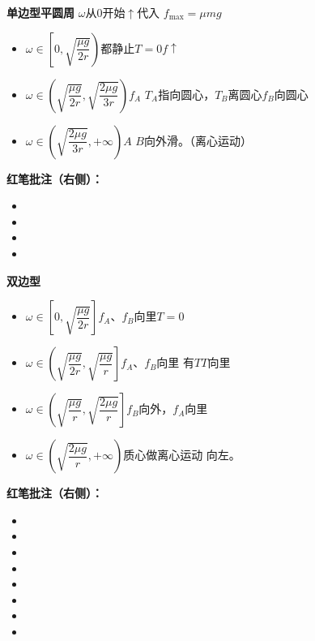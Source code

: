\textbf{单边型平圆周}
$\omega$从0开始$\uparrow$\quad 代入 $f_{\max}=\mu mg$
\begin{itemize}
\item $\omega\in\left[0,\sqrt{\dfrac{\mu g}{2r}}\right)$\quad 都静止\quad $T=0$\quad $f\uparrow$
\item $\omega\in\left(\sqrt{\dfrac{\mu g}{2r}},\sqrt{\dfrac{2\mu g}{3r}}\right)$\quad $f_A$ $T_A$指向圆心，$T_B$离圆心\quad $f_B$向圆心
\item $\omega\in\left(\sqrt{\dfrac{2\mu g}{3r}},+\infty\right)$\quad $A$ $B$向外滑。（离心运动）
\end{itemize}
\textbf{红笔批注（右侧）：}
\begin{itemize}
\item {}
\item {} %
\item {}
\item {}
\end{itemize}
\textbf{双边型}
\begin{itemize}
\item $\omega\in\left[0,\sqrt{\dfrac{\mu g}{2r}}\right]$\quad $f_A$、$f_B$向里\quad $T=0$
\item $\omega\in\left(\sqrt{\dfrac{\mu g}{2r}},\sqrt{\dfrac{\mu g}{r}}\right]$\quad $f_A$、$f_B$向里 有$T$\quad $T$向里
\item $\omega\in\left(\sqrt{\dfrac{\mu g}{r}},\sqrt{\dfrac{2\mu g}{r}}\right]$\quad $f_B$向外，$f_A$向里
\item $\omega\in\left(\sqrt{\dfrac{2\mu g}{r}},+\infty\right)$\quad 质心做离心运动 向左。
\end{itemize}
\textbf{红笔批注（右侧）：}
\begin{itemize}
\item {}
\item {}
\item {}
\item {}
\item {}
\item {}
\item {}
\item {}
\end{itemize}
